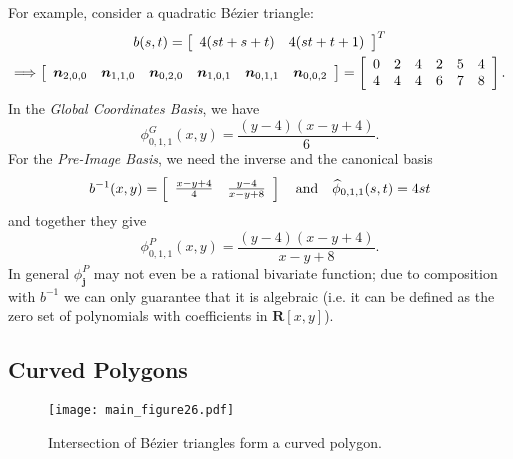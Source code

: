 \documentclass[letterpaper,10pt]{article}
\theoremstyle{definition}
\newcommand{\reals}{\mathbf{R}}
\begin{document}
\noindent For example, consider a quadratic B\'{e}zier triangle:
\begin{gather}
b(s, t) = \left[ \begin{array}{c c}
    4 (s t + s + t) & 4 (s t + t + 1)
  \end{array}\right]^T \\
\Longrightarrow
\left[ \begin{array}{c c c c c c}
    \bm{n}_{2, 0, 0} &
    \bm{n}_{1, 1, 0} &
    \bm{n}_{0, 2, 0} &
    \bm{n}_{1, 0, 1} &
    \bm{n}_{0, 1, 1} &
    \bm{n}_{0, 0, 2}
  \end{array}\right] = \left[ \begin{array}{c c c c c c}
    0 & 2 & 4 & 2 & 5 & 4 \\
    4 & 4 & 4 & 6 & 7 & 8
  \end{array}\right].
\end{gather}
In the \emph{Global Coordinates Basis}, we have
\begin{equation}
\phi^{G}_{0, 1, 1}(x, y) = \frac{(y - 4) (x - y + 4)}{6}.
\end{equation}
For the \emph{Pre-Image Basis}, we need the inverse
and the canonical basis
\begin{equation}
b^{-1}(x, y) = \left[ \begin{array}{c c}
    \frac{x - y + 4}{4} & \frac{y - 4}{x - y + 8}
  \end{array}\right] \quad \text{and} \quad
\widehat{\phi}_{0, 1, 1}(s, t) = 4 s t
\end{equation}
and together they give
\begin{equation}
\phi^{P}_{0, 1, 1}(x, y) = \frac{(y - 4) (x - y + 4)}{x - y + 8}.
\end{equation}
In general \(\phi_{\bm{j}}^P\) may not even be a rational bivariate
function; due to composition with \(b^{-1}\) we can only guarantee that
it is algebraic (i.e. it can be defined as the zero set of polynomials
with coefficients in \(\reals\left[x, y\right]\)).

\subsection{Curved Polygons}\label{subsec:curved-polygons}

\begin{figure}
  \texttt{[image: main\_figure26.pdf]}
  \centering
  \captionsetup{width=.75\linewidth}
  \caption{Intersection of B\'{e}zier triangles form a curved polygon.}
  \label{fig:bezier-triangle-intersect}
\end{figure}
\end{document}
